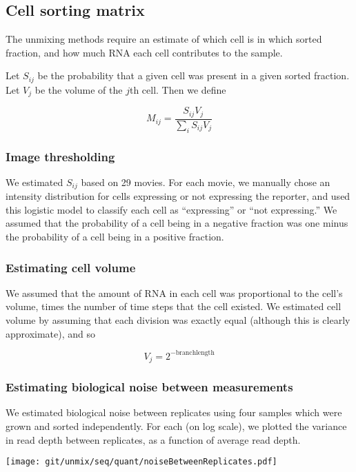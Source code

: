 \documentclass{article}
\begin{document}
\subsection*{Cell sorting matrix}

The unmixing methods require an estimate of which cell is in which sorted fraction,
and how much RNA each cell contributes to the sample.

Let $S_{ij}$ be
the probability that a given cell was present in a given sorted fraction. Let $V_j$
be the volume of the $j$th cell. Then we define

\[
M_{ij} = \frac{S_{ij} V_j}{ \sum\limits_{i}^{} S_{ij} V_j }
\]

\subsubsection*{Image thresholding}

We estimated $S_{ij}$ based on 29 movies.
For each movie, we manually chose an intensity distribution for cells expressing
or not expressing the reporter, and 
used this logistic model to classify each cell as ``expressing'' or ``not expressing.''
We assumed that the probability of a cell being in a negative fraction was
one minus the probability of a cell being in a positive fraction.

\subsubsection*{Estimating cell volume}

We assumed that the amount of RNA in each cell was proportional to the cell's volume,
times the number of time steps that the cell existed.
We estimated cell volume by assuming that each division was exactly equal (although
this is clearly approximate), and so

\[
V_j = 2^{-\mathrm{branchlength}}
\]

\subsubsection*{Estimating biological noise between measurements}

We estimated biological noise between replicates using four samples which were
grown and sorted independently. For each (on log scale), we plotted the variance
in read depth between replicates, as a function of average read depth.

\texttt{[image: git/unmix/seq/quant/noiseBetweenReplicates.pdf]}
\end{document}
